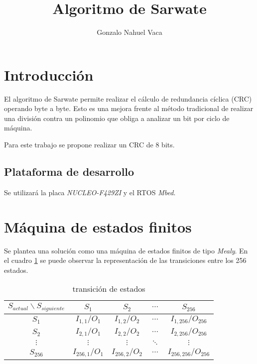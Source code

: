 \documentclass[
12pt,
spanish,
singlespacing,
parskip,
headsepline]{article}
\title{Algoritmo de Sarwate}
\author{Gonzalo Nahuel Vaca}
\begin{document}
	
\maketitle

\section{Introducción}
\label{sec:intro}

El algoritmo de Sarwate permite realizar el cálculo de redundancia cíclica (CRC) operando byte a byte.
Esto es una mejora frente al método tradicional de realizar una división contra un polinomio que obliga a analizar un bit por ciclo de máquina.

Para este trabajo se propone realizar un CRC de 8 bits.

\subsection{Plataforma de desarrollo}
\label{sub:plataforma}

Se utilizará la placa \emph{NUCLEO-F429ZI} y el RTOS \emph{Mbed}.

\section{Máquina de estados finitos}
\label{sec:mef}

Se plantea una solución como una máquina de estados finitos de tipo \emph{Mealy}.
En el cuadro \ref{tab:estados} se puede observar la representación de las transiciones entre los 256 estados.

\begin{table}[!htbp] \centering
\begin{tabular}{|c|c|c|c|c|}
\hline
$S_{actual} \backslash S_{siguiente}$ & $S_1$             & $S_2$             & $\cdots$ & $S_{256}$               \\ \hline
$S_1$                                 & $I_{1,1} / O_1$   & $I_{1,2} / O_2$   & $\cdots$ & $I_{1,256} / O_{256}$   \\ \hline
$S_2$                                 & $I_{2,1} / O_1$   & $I_{2,2} / O_2$   & $\cdots$ & $I_{2,256} / O_{256}$   \\ \hline
$\vdots$                              & $\vdots$          & $\vdots$          & $\ddots$ & $\vdots$                \\ \hline
$S_{256}$                             & $I_{256,1} / O_1$ & $I_{256,2} / O_2$ & $\cdots$ & $I_{256,256} / O_{256}$ \\ \hline
\end{tabular}
\caption{transición de estados}
\label{tab:estados}
\end{table}
\end{document}
